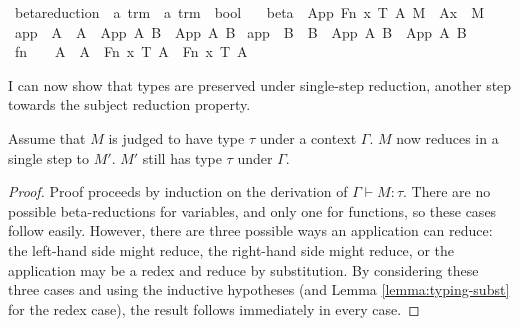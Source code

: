 \begin{implementation}
\isamarkupfalse%
\ beta{\isacharunderscore}reduction\ {\isacharcolon}{\isacharcolon}\ {\isachardoublequoteopen}{\isacharprime}a\ trm\ {\isasymRightarrow}\ {\isacharprime}a\ trm\ {\isasymRightarrow}\ bool{\isachardoublequoteclose}\ \isanewline
\ \ beta{\isacharcolon}\ \ {\isachardoublequoteopen}{\isacharparenleft}App\ {\isacharparenleft}Fn\ x\ T\ A{\isacharparenright}\ M{\isacharparenright}\ {\isasymrightarrow}{\isasymbeta}\ {\isacharparenleft}A{\isacharbrackleft}x\ {\isacharcolon}{\isacharcolon}{\isacharequal}\ M{\isacharbrackright}{\isacharparenright}{\isachardoublequoteclose}\isanewline
{\isacharbar}\ app{}{\isacharcolon}\ \ {\isachardoublequoteopen}A\ {\isasymrightarrow}{\isasymbeta}\ A{\isacharprime}\ {\isasymLongrightarrow}\ {\isacharparenleft}App\ A\ B{\isacharparenright}\ {\isasymrightarrow}{\isasymbeta}\ {\isacharparenleft}App\ A{\isacharprime}\ B{\isacharparenright}{\isachardoublequoteclose}\isanewline
{\isacharbar}\ app{}{\isacharcolon}\ \ {\isachardoublequoteopen}B\ {\isasymrightarrow}{\isasymbeta}\ B{\isacharprime}\ {\isasymLongrightarrow}\ {\isacharparenleft}App\ A\ B{\isacharparenright}\ {\isasymrightarrow}{\isasymbeta}\ {\isacharparenleft}App\ A\ B{\isacharprime}{\isacharparenright}{\isachardoublequoteclose}\isanewline
{\isacharbar}\ fn{\isacharcolon}\ \ \ \ {\isachardoublequoteopen}A\ {\isasymrightarrow}{\isasymbeta}\ A{\isacharprime}\ {\isasymLongrightarrow}\ {\isacharparenleft}Fn\ x\ T\ A{\isacharparenright}\ {\isasymrightarrow}{\isasymbeta}\ {\isacharparenleft}Fn\ x\ T\ A{\isacharprime}{\isacharparenright}{\isachardoublequoteclose}\isanewline
\end{implementation}

I can now show that types are preserved under single-step reduction, another step towards the subject reduction property.
\begin{lemma}
\label{lemma:preservation'}
Assume that \(M\) is judged to have type \(\tau\) under a context \(\Gamma\).
\(M\) now reduces in a single step to \(M'\).
\(M'\) still has type \(\tau\) under \(\Gamma\).
\end{lemma}
\begin{proof}
Proof proceeds by induction on the derivation of \(\Gamma \vdash M : \tau\).
There are no possible beta-reductions for variables, and only one for functions, so these cases follow easily.
However, there are three possible ways an application can reduce: the left-hand side might reduce, the right-hand side might reduce, or the application may be a redex and reduce by substitution.
By considering these three cases and using the inductive hypotheses (and Lemma \ref{lemma:typing-subst} for the redex case), the result follows immediately in every case.
\end{proof}

